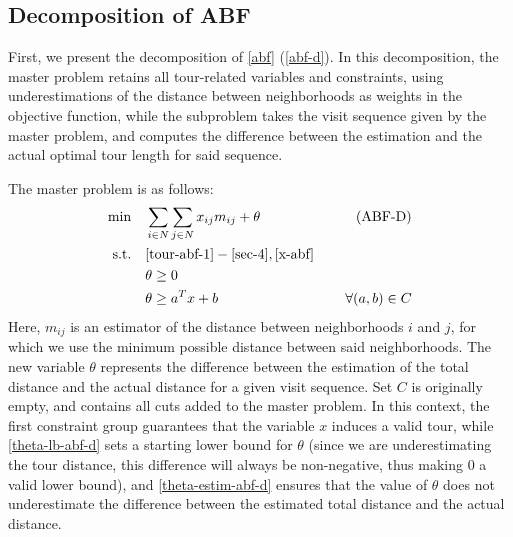 \documentclass[pdflatex,sn-mathphys-num]{sn-jnl}%
\begin{document}
\subsection{Decomposition of ABF}

First, we present the decomposition of \ref{abf} (\ref{abf-d}). In this decomposition, the master problem retains all tour-related variables and constraints, using underestimations of the distance between neighborhoods as weights in the objective function, while the subproblem takes the visit sequence given by the master problem, and computes the difference between the estimation and the actual optimal tour length for said sequence.

The master problem is as follows:
\begin{subequations} %
\begin{align}
\min &&& \sum_{i \in N}\sum_{j\in N} x_{ij} m_{ij} + \theta & \label{abf-d} \tag{ABF-D}\\
\text{s.t.} &&& \eqref{tour-abf-1}-\eqref{sec-4}, \eqref{x-abf}& \nonumber \\
&&& \theta \geq 0 & \label{theta-lb-abf-d}\\
&&& \theta \geq a^Tx + b & \forall (a,b) \in C \label{theta-estim-abf-d}
\end{align}
\end{subequations}
Here, $m_{ij}$ is an estimator of the distance between neighborhoods $i$ and $j$, for which we use the minimum possible distance between said neighborhoods. The new variable $\theta$ represents the difference between the estimation of the total distance and the actual distance for a given visit sequence. Set $C$ is originally empty, and contains all cuts added to the master problem. In this context, the first constraint group guarantees that the variable $x$ induces a valid tour, while \eqref{theta-lb-abf-d} sets a starting lower bound for $\theta$ (since we are underestimating the tour distance, this difference will always be non-negative, thus making 0 a valid lower bound), and \eqref{theta-estim-abf-d} ensures that the value of $\theta$ does not underestimate the difference between the estimated total distance and the actual distance. 
\end{document}
